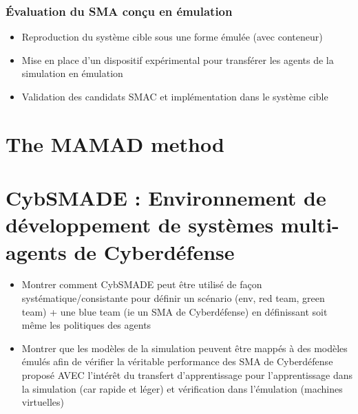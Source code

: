 \subsubsection{Évaluation du SMA conçu en émulation}
\begin{itemize}

    \item Reproduction du système cible sous une forme émulée (avec conteneur)
    \item Mise en place d'un dispositif expérimental pour transférer les agents de la simulation en émulation
    \item Validation des candidats SMAC et implémentation dans le système cible

\end{itemize}

\section{The MAMAD method}




\section{CybSMADE : Environnement de développement de systèmes multi-agents de Cyberdéfense}\label{sec:cybSMAde}

\begin{itemize}

    \item Montrer comment CybSMADE peut être utilisé de façon systématique/consistante pour définir un scénario (env, red team, green team) + une blue team (ie un SMA de Cyberdéfense) en définissant soit même les politiques des agents
    \item Montrer que les modèles de la simulation peuvent être mappés à des modèles émulés afin de vérifier la véritable performance des SMA de Cyberdéfense proposé AVEC l'intérêt du transfert d'apprentissage pour l'apprentissage dans la simulation (car rapide et léger) et vérification dans l'émulation (machines virtuelles)
\end{itemize}